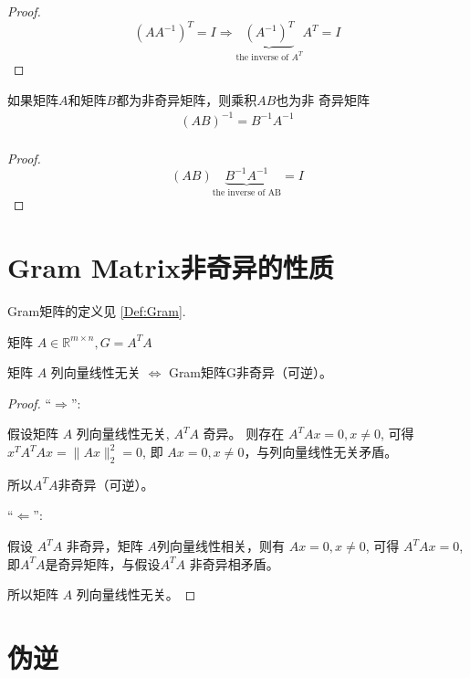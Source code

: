 \begin{proof}
    $$\left(A A^{-1}\right)^{T}=I \Rightarrow \underbrace{\left(A^{-1}\right)^{T}}_{\text{the inverse of }A^T}   A^{T}=I$$
\end{proof}

\begin{corollary}
    如果矩阵$A$和矩阵$B$都为非奇异矩阵，则乘积$AB$也为非 奇异矩阵
$$
\begin{array}{l}
(A B)^{-1}=B^{-1} A^{-1} \\
\end{array}
$$
\end{corollary}

\begin{proof}
    $$(A B) \underbrace{B^{-1} A^{-1}} _{\text{the inverse of AB}}=I$$
\end{proof}

\section{Gram Matrix非奇异的性质}

\label{Sect:GramNonSingular}

Gram矩阵的定义见 \ref{Def:Gram}.

\begin{corollary}
    矩阵 $ A \in \mathbb{R}^{m \times n},   {G}=A^{T} A $

矩阵 $ A $ 列向量线性无关 $ \Leftrightarrow $ Gram矩阵G非奇异（可逆）。
\end{corollary}

\begin{proof}
    “$ \Rightarrow $”: 
    
    假设矩阵 $ A $ 列向量线性无关, $ A^{T} A $ 奇异。  则存在 $ A^{T} A x=0, x \neq 0 $, 可得 $ x^{T} A^{T} A x=\|A x\|_{2}^{2}=0 $, 即 $ A x=0 , x \neq 0$，与列向量线性无关矛盾。

    所以$ A^{T} A $非奇异（可逆）。

    “$ \Leftarrow $”:
    
    假设 $ A^{T} A $ 非奇异，矩阵 $ A $列向量线性相关，则有 $ A x=0, x \neq 0 $, 可得 $ A^{T} A x=0 $, 即$ A^{T} A $是奇异矩阵，与假设$ A^{T} A $ 非奇异相矛盾。
    
    所以矩阵 $ A $ 列向量线性无关。
\end{proof}

\section{伪逆}


